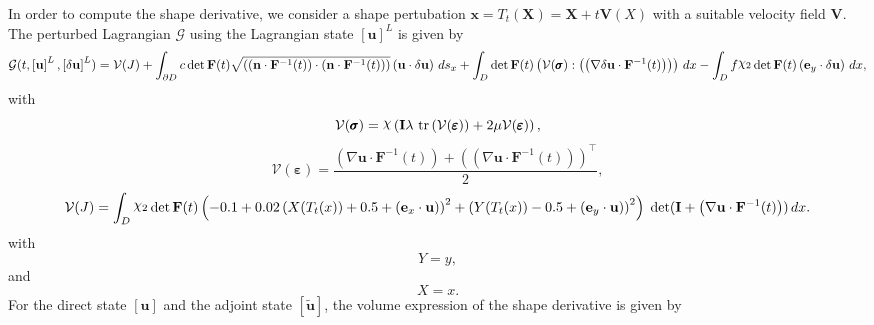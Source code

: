 \documentclass[preview]{standalone}
\let\oldcdot\cdot
\let\cdot\oldcdot
\begin{document}
In order to compute the shape derivative, we consider a shape pertubation $\mathbf x = T_t(\mathbf X) = \mathbf X + t \mathbf  V(X)$ with a suitable velocity field $\mathbf V$. The perturbed Lagrangian $\mathcal G$ using the Lagrangian state $\left[ {\mathbf{ u }}\right]^{L}$ is given by
\begin{dmath*}
\mathcal G(t,\left[ {\mathbf{ u }}\right]^{L},\left[ {\delta\mathbf{  u }}\right]^{L}) = \mathcal V(J) +  \int_{\partial D} c  \operatorname{det}\mathbf F( t )  \sqrt{\left( \left( \mathbf n \cdot  \mathbf F^{-1}(t) \right) \cdot \left( \mathbf n \cdot  \mathbf F^{-1}(t) \right) \right)} \left( {\mathbf{ u }} \cdot {\delta\mathbf{  u }} \right) \,ds_x +  \int_{D}  \operatorname{det}\mathbf F( t )  \left( \mathcal V(\pmb \sigma) \mathrel{:} \left( \left(  \nabla {\delta\mathbf{  u }}  \cdot  \mathbf F^{-1}(t) \right) \right)\right) \,dx -  \int_{D} f \raisebox{\depth}{$\chi_2$}  \operatorname{det}\mathbf F( t )  \left( \mathbf e_y \cdot {\delta\mathbf{  u }} \right) \,dx , 
\end{dmath*}
with
\begin{dmath*}
\mathcal V(\pmb \sigma) = \raisebox{\depth}{$\chi$} \left(\mathbf{I} \lambda  \,\operatorname{tr}\left(\mathcal V(\pmb \varepsilon)\right)  + 2 \mu \mathcal V(\pmb \varepsilon)\right),
 \end{dmath*}
\begin{dmath*}
\mathcal V(\pmb \varepsilon) = \frac{\left(  \nabla {\mathbf{ u }}  \cdot  \mathbf F^{-1}(t) \right) +  \left( \left(  \nabla {\mathbf{ u }}  \cdot  \mathbf F^{-1}(t) \right) \right)^\top }{2},
 \end{dmath*}
\begin{dmath*}
\mathcal V(J) =  \int_{D} \raisebox{\depth}{$\chi_2$}  \operatorname{det}\mathbf F( t )  \left(-0.1 + 0.02 \left(X(T_t(x)) + 0.5 + \left( \mathbf e_x \cdot {\mathbf{ u }} \right)\right)^{2} + \left(Y(T_t(x)) - 0.5 + \left( \mathbf e_y \cdot {\mathbf{ u }} \right)\right)^{2}\right)  \;\operatorname{det}(\mathbf{I} + \left(  \nabla {\mathbf{ u }}  \cdot  \mathbf F^{-1}(t) \right))  \,dx.
 \end{dmath*}
with 
\begin{dmath*}
Y = y,\end{dmath*}
and\begin{dmath*}
X = x.\end{dmath*}
For the direct state $\left[ {\mathbf{ u }}\right]$ and the adjoint state $\left[ \tilde{\mathbf{ u }}\right]$, the volume expression of the shape derivative is given by
\end{document}
